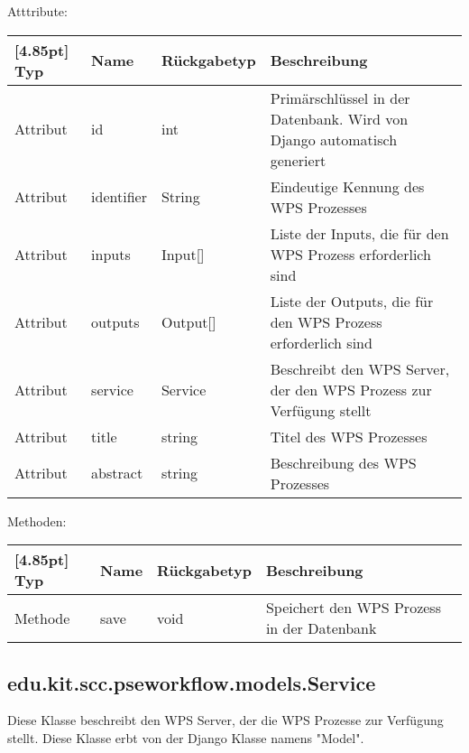 			Atttribute:
			\begin{center}
				\setlength\tabcolsep{5pt}
				\renewcommand{\arraystretch}{1.5}
				
				\begin{tabularx}{\textwidth}{|l|l|l|X|}
					\hline
					\rowcolor[gray]{0.75}[4.85pt]
					Typ & Name & Rückgabetyp & Beschreibung \\ \hline 
					Attribut & id & int & Primärschlüssel in der Datenbank. Wird von Django automatisch generiert \\ \hline
					Attribut & identifier & String & Eindeutige Kennung des WPS Prozesses \\ \hline
					Attribut & inputs & Input[] &  Liste der Inputs, die für den WPS Prozess erforderlich sind\\ \hline
					Attribut & outputs & Output[] & Liste der Outputs, die für den WPS Prozess erforderlich sind \\ \hline
					Attribut & service & Service & Beschreibt den WPS Server, der den WPS Prozess zur Verfügung stellt   \\ \hline
					Attribut & title & string & Titel des WPS Prozesses \\ \hline
					Attribut & abstract & string & Beschreibung des WPS Prozesses\\
					\hline
				\end{tabularx}
			\end{center}
			
			Methoden:
			\begin{center}
				\setlength\tabcolsep{5pt}
				\renewcommand{\arraystretch}{1.5}
				
				\begin{tabularx}{\textwidth}{|l|l|l|X|}
					\hline
					\rowcolor[gray]{0.75}[4.85pt]
					Typ & Name & Rückgabetyp & Beschreibung \\ \hline 
					Methode & save & void & Speichert den WPS Prozess in der Datenbank  \\
					\hline
				\end{tabularx}
			\end{center}
			
			

        \subsection{edu.kit.scc.pseworkflow.models.Service}
			Diese Klasse beschreibt den WPS Server, der die WPS Prozesse zur Verfügung stellt. \newline
			Diese Klasse erbt von der Django Klasse namens "Model".
			
